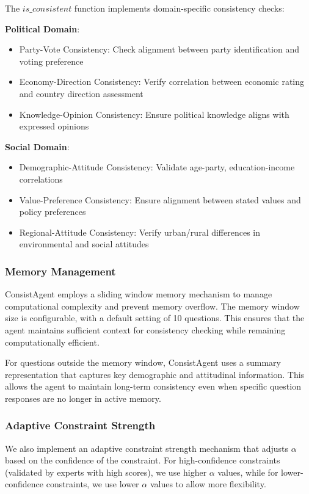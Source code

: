 \documentclass[sigconf, anonymous]{acmart}
\begin{document}
The $is\_consistent$ function implements domain-specific consistency checks:

\textbf{Political Domain}:
\begin{itemize}
    \item Party-Vote Consistency: Check alignment between party identification and voting preference
    \item Economy-Direction Consistency: Verify correlation between economic rating and country direction assessment
    \item Knowledge-Opinion Consistency: Ensure political knowledge aligns with expressed opinions
\end{itemize}

\textbf{Social Domain}:
\begin{itemize}
    \item Demographic-Attitude Consistency: Validate age-party, education-income correlations
    \item Value-Preference Consistency: Ensure alignment between stated values and policy preferences
    \item Regional-Attitude Consistency: Verify urban/rural differences in environmental and social attitudes
\end{itemize}

\subsubsection{Memory Management}

ConsistAgent employs a sliding window memory mechanism to manage computational complexity and prevent memory overflow. The memory window size is configurable, with a default setting of 10 questions. This ensures that the agent maintains sufficient context for consistency checking while remaining computationally efficient.

For questions outside the memory window, ConsistAgent uses a summary representation that captures key demographic and attitudinal information. This allows the agent to maintain long-term consistency even when specific question responses are no longer in active memory.

\subsubsection{Adaptive Constraint Strength}

We also implement an adaptive constraint strength mechanism that adjusts $\alpha$ based on the confidence of the constraint. For high-confidence constraints (validated by experts with high scores), we use higher $\alpha$ values, while for lower-confidence constraints, we use lower $\alpha$ values to allow more flexibility.
\end{document}
